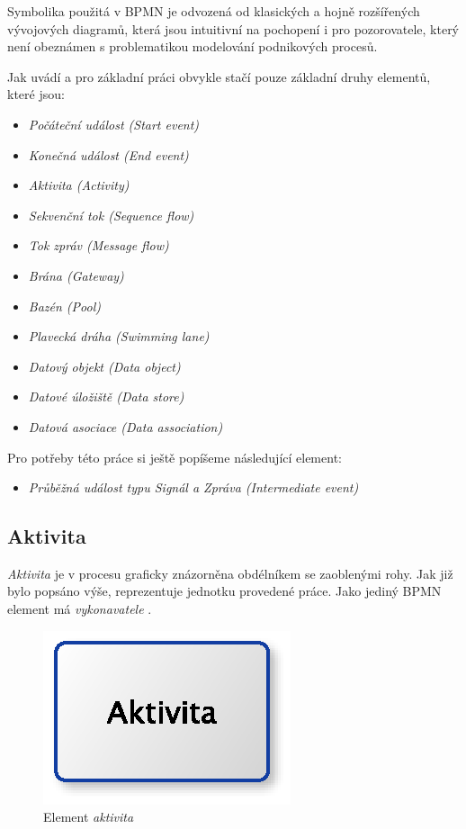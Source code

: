 Symbolika použitá v BPMN je odvozená od klasických a hojně rozšířených vývojových diagramů, která jsou intuitivní na pochopení i pro pozorovatele, který není obeznámen s problematikou modelování podnikových procesů.

Jak uvádí \cite{Silver2011} a \cite{Vasicek2008} pro základní práci obvykle stačí pouze základní druhy elementů, které jsou:

\begin{itemize}
\item \textit{Počáteční událost (Start event)}
\item \textit{Konečná událost (End event)}
\item \textit{Aktivita (Activity)}
\item \textit{Sekvenční tok (Sequence flow)}
\item \textit{Tok zpráv (Message flow)}
\item \textit{Brána (Gateway)}
\item \textit{Bazén (Pool)}
\item \textit{Plavecká dráha (Swimming lane)}
\item \textit{Datový objekt (Data object)}
\item \textit{Datové úložiště (Data store)}
\item \textit{Datová asociace (Data association)}
\end{itemize}

Pro potřeby této práce si ještě popíšeme následující element:

\begin{itemize}
\item \textit{Průběžná událost typu Signál a Zpráva (Intermediate event)}
\end{itemize}

\subsection{Aktivita}
\textit{Aktivita} je v procesu graficky znázorněna obdélníkem se zaoblenými rohy. Jak již bylo popsáno výše, reprezentuje jednotku provedené práce. Jako jediný BPMN element má \textit{vykonavatele} \cite{Silver2011}. 

\begin{figure}[htbp]\centering
\includegraphics{obrazky/activity}
\caption{Element \textit{aktivita}}
\label{fig:aktivita}
\end{figure}

